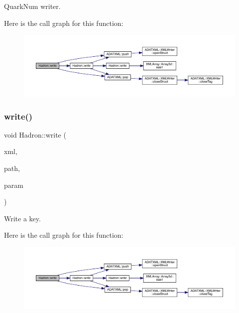 Quark\+Num writer. 

Here is the call graph for this function\+:\nopagebreak
\begin{figure}[H]
\begin{center}
\leavevmode
\includegraphics[width=350pt]{d1/daf/namespaceHadron_a7da51caa70247c9ab9d11f8275ec93b7_cgraph}
\end{center}
\end{figure}
\mbox{\label{namespaceHadron_a2454ead756c8c4f2b1f75bbf8d3c1070}} 
\subsubsection{\texorpdfstring{write()}{write()}\hspace{0.1cm}{\footnotesize\ttfamily [6/95]}}
{\footnotesize\ttfamily void Hadron\+::write (\begin{DoxyParamCaption}\item[{\mbox{\hyperlink{classADATXML_1_1XMLWriter}{X\+M\+L\+Writer}} \&}]{xml,  }\item[{const std\+::string \&}]{path,  }\item[{const \mbox{\hyperlink{structHadron_1_1KeyCGCIrrepMom__t}{Key\+C\+G\+C\+Irrep\+Mom\+\_\+t}} \&}]{param }\end{DoxyParamCaption})}



Write a key. 

Here is the call graph for this function\+:\nopagebreak
\begin{figure}[H]
\begin{center}
\leavevmode
\includegraphics[width=350pt]{d1/daf/namespaceHadron_a2454ead756c8c4f2b1f75bbf8d3c1070_cgraph}
\end{center}
\end{figure}
\mbox{\label{namespaceHadron_ae327bbb04efa053f7be135b73bb596a7}} 
